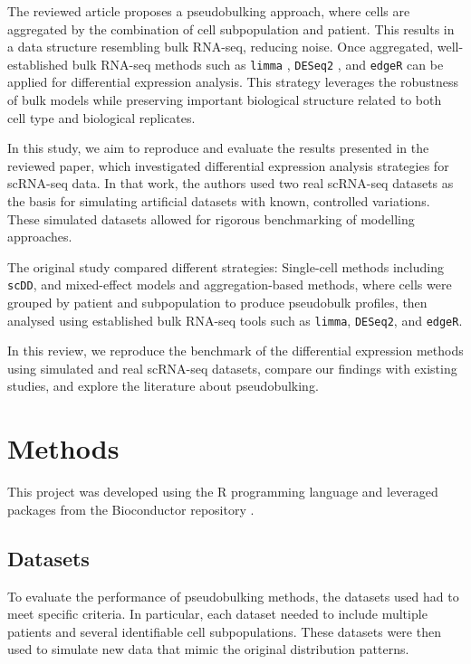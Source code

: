 \documentclass[a4paper, 11pt, twocolumn]{article}
\begin{document}
\begin{multicols}{2}
The reviewed article \citep{crowell2020muscat} proposes a pseudobulking approach, where cells are aggregated by the combination of cell subpopulation and patient. This results in a data structure resembling bulk RNA-seq, reducing noise. Once aggregated, well-established bulk RNA-seq methods such as \texttt{limma} \citep{limma}, \texttt{DESeq2} \citep{deseq2}, and \texttt{edgeR} \citep{edger} can be applied for differential expression analysis. This strategy leverages the robustness of bulk models while preserving important biological structure related to both cell type and biological replicates.


In this study, we aim to reproduce and evaluate the results presented in the reviewed paper, which investigated differential expression analysis strategies for scRNA-seq data. In that work, the authors used two real scRNA-seq datasets as the basis for simulating artificial datasets with known, controlled variations. These simulated datasets allowed for rigorous benchmarking of modelling approaches.

The original study compared different strategies: Single-cell methods including \texttt{scDD}, and mixed-effect models and aggregation-based methods, where cells were grouped by patient and subpopulation to produce pseudobulk profiles, then analysed using established bulk RNA-seq tools such as \texttt{limma}, \texttt{DESeq2}, and \texttt{edgeR}. 

In this review, we reproduce the benchmark of the differential expression methods using simulated and real scRNA-seq datasets, compare our findings with existing studies, and explore the literature about pseudobulking.

\section{Methods}

This project was developed using the R programming language \citep{base} and leveraged packages from the Bioconductor repository \citep{bioc}.

\subsection{Datasets}

To evaluate the performance of pseudobulking methods, the datasets used had to meet specific criteria. In particular, each dataset needed to include multiple patients and several identifiable cell subpopulations. These datasets were then used to simulate new data that mimic the original distribution patterns.


\end{multicols}
\end{document}
